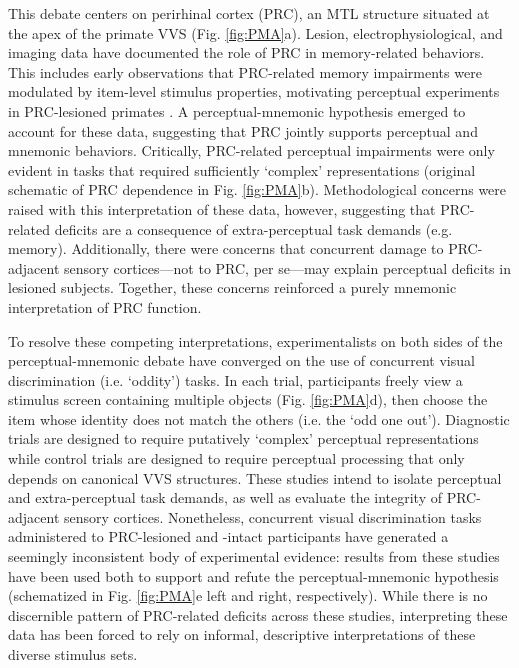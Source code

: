 \documentclass[11pt]{article}
\begin{document}
This debate centers on perirhinal cortex (PRC), an MTL structure situated at the apex of the primate VVS\cite{suzuki2009memory, miyashita2019perirhinal} (Fig. \ref{fig:PMA}a). Lesion, electrophysiological, and imaging data have documented the role of PRC in memory-related behaviors\cite{miyashita2019perirhinal, scoville1957loss, aggleton2006interleaving, brown2015noninvasive}. This includes early observations that PRC-related memory impairments were modulated by item-level stimulus properties\cite{meunier1993effects, eacott1994preserved, gaffan1992monkeys, bussey2002perirhinal}, motivating perceptual experiments in PRC-lesioned primates \cite{bussey2002perirhinal, buckley1998objectidentification, buckley1997impairment, buckley1998configural}. A perceptual-mnemonic hypothesis emerged to account for these data, suggesting that PRC jointly supports perceptual and mnemonic behaviors\cite{murray1999perceptual, bussey2002organization}. Critically, PRC-related perceptual impairments were only evident in tasks that required sufficiently `complex' representations (original schematic of PRC dependence in Fig. \ref{fig:PMA}b). Methodological concerns were raised with this interpretation of these data\cite{buffalo1998reexamination, buffalo1999dissociation, buffalo1998human}, however, suggesting that PRC-related deficits are a consequence of extra-perceptual task demands (e.g. memory). Additionally, there were concerns that concurrent damage to PRC-adjacent sensory cortices---not to PRC, per se---may explain perceptual deficits in lesioned subjects. Together, these concerns reinforced a purely mnemonic interpretation of PRC function. 

To resolve these competing interpretations, experimentalists on both sides of the perceptual-mnemonic debate have converged on the use of concurrent visual discrimination (i.e. `oddity') tasks. In each trial, participants freely view a stimulus screen containing multiple objects (Fig. \ref{fig:PMA}d), then choose the item whose identity does not match the others (i.e. the `odd one out'). Diagnostic trials are designed to require putatively `complex' perceptual representations while control trials are designed to require perceptual processing that only depends on canonical VVS structures. These studies intend to isolate perceptual and extra-perceptual task demands, as well as evaluate the integrity of PRC-adjacent sensory cortices. Nonetheless, concurrent visual discrimination tasks administered to PRC-lesioned and -intact participants have generated a seemingly inconsistent body of experimental evidence: results from these studies have been used both to support\cite{buckley2001selective,  bussey2003impairments, lee2005perceptual, lee2006differentiating, barense2007human, inhoff2019understanding} and refute\cite{stark2000intact, levy2005intact, squire2006lack, knutson2012visual} the perceptual-mnemonic hypothesis (schematized in Fig. \ref{fig:PMA}e left and right, respectively). While there is no discernible pattern of PRC-related deficits across these studies, interpreting these data has been forced to rely on informal, descriptive interpretations of these diverse stimulus sets. 
\end{document}
